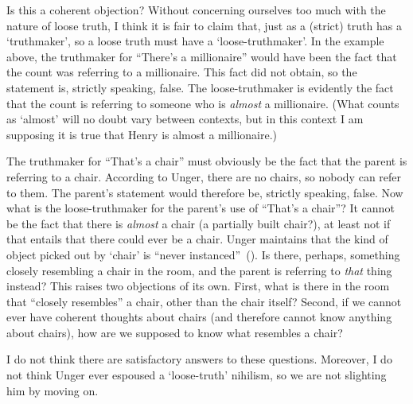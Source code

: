 \documentclass[11pt]{article}
\newcommand{\stage}[3]%
{%
	\begin{spacing}{1}%
	\vspace{0pt}
		\begin{description}[style=nextline, parsep=0pt, leftmargin=15mm, itemindent=-10mm, font=\mdseries]
			\item[\textsc{#1} \emph{#2}] #3
		\end{description}%
	\end{spacing}%
}
\begin{document}
\begin{spacing}{1.5}
Is this a coherent objection? Without concerning ourselves too much with the nature of loose truth, I think it is fair to claim that, just as a (strict) truth has a `truthmaker', so a loose truth must have a `loose-truthmaker'.  In the example above, the truthmaker for ``There's a millionaire'' would have been the fact that the count was referring to a millionaire.  This fact did not obtain, so the statement is, strictly speaking, false.  The loose-truthmaker is evidently the fact that the count is referring to someone who is {\em almost} a millionaire.  (What counts as `almost' will no doubt vary between contexts, but in this context I am supposing it is true that Henry is almost a millionaire.)

The truthmaker for ``That's a chair'' must obviously be the fact that the parent is referring to a chair.  According to Unger, there are no chairs, so nobody can refer to them.  The parent's statement would therefore be, strictly speaking, false.  Now what is the loose-truthmaker for the parent's use of ``That's a chair''? It cannot be the fact that there is {\em almost} a chair (a partially built chair?), at least not if that entails that there could ever be a chair.  Unger maintains that the kind of object picked out by `chair' is ``never instanced''~(\citeyear[147]{unger1979}).  Is there, perhaps, something closely resembling a chair in the room, and the parent is referring to {\em that} thing instead? This raises two objections of its own.  First, what is there in the room that ``closely resembles'' a chair, other than the chair itself? Second, if we cannot ever have coherent thoughts about chairs (and therefore cannot know anything about chairs), how are we supposed to know what resembles a chair?

I do not think there are satisfactory answers to these questions.  Moreover, I do not think Unger ever espoused a `loose-truth' nihilism, so we are not slighting him by moving on.

%


\end{spacing}
\end{document}
